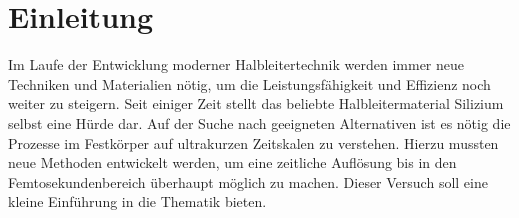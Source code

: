 \chapter{Einleitung}

Im Laufe der Entwicklung moderner Halbleitertechnik werden immer neue Techniken
und Materialien nötig, um die Leistungsfähigkeit und Effizienz noch weiter zu
steigern. Seit einiger Zeit stellt das beliebte Halbleitermaterial Silizium selbst
eine Hürde dar. Auf der Suche nach geeigneten Alternativen ist es nötig die 
Prozesse im Festkörper auf ultrakurzen Zeitskalen zu verstehen. Hierzu mussten
neue Methoden entwickelt werden, um eine zeitliche Auflösung bis in den 
Femtosekundenbereich überhaupt möglich zu machen. Dieser Versuch soll eine 
kleine Einführung in die Thematik bieten.
